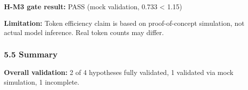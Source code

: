 \textbf{H-M3 gate result:} PASS (mock validation, 0.733 < 1.15)

\textbf{Limitation:} Token efficiency claim is based on proof-of-concept simulation, not actual model inference. Real token counts may differ.

\subsubsection{5.5 Summary}

\begin{table}[htbp]
\centering
{}
\end{table}

\textbf{Overall validation:} 2 of 4 hypotheses fully validated, 1 validated via mock simulation, 1 incomplete.
